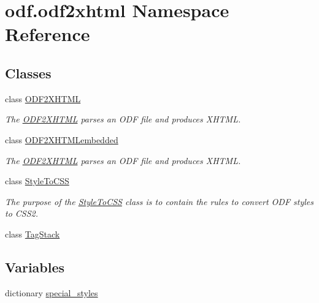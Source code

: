 \hypertarget{namespaceodf_1_1odf2xhtml}{\section{odf.\+odf2xhtml Namespace Reference}
\label{namespaceodf_1_1odf2xhtml}
}
\subsection*{Classes}
\begin{DoxyCompactItemize}
\item 
class \hyperlink{classodf_1_1odf2xhtml_1_1ODF2XHTML}{O\+D\+F2\+X\+H\+T\+M\+L}
\begin{DoxyCompactList}\small\item\em The \hyperlink{classodf_1_1odf2xhtml_1_1ODF2XHTML}{O\+D\+F2\+X\+H\+T\+M\+L} parses an O\+D\+F file and produces X\+H\+T\+M\+L. \end{DoxyCompactList}\item 
class \hyperlink{classodf_1_1odf2xhtml_1_1ODF2XHTMLembedded}{O\+D\+F2\+X\+H\+T\+M\+Lembedded}
\begin{DoxyCompactList}\small\item\em The \hyperlink{classodf_1_1odf2xhtml_1_1ODF2XHTML}{O\+D\+F2\+X\+H\+T\+M\+L} parses an O\+D\+F file and produces X\+H\+T\+M\+L. \end{DoxyCompactList}\item 
class \hyperlink{classodf_1_1odf2xhtml_1_1StyleToCSS}{Style\+To\+C\+S\+S}
\begin{DoxyCompactList}\small\item\em The purpose of the \hyperlink{classodf_1_1odf2xhtml_1_1StyleToCSS}{Style\+To\+C\+S\+S} class is to contain the rules to convert O\+D\+F styles to C\+S\+S2. \end{DoxyCompactList}\item 
class \hyperlink{classodf_1_1odf2xhtml_1_1TagStack}{Tag\+Stack}
\end{DoxyCompactItemize}
\subsection*{Variables}
\begin{DoxyCompactItemize}
\item 
dictionary \hyperlink{namespaceodf_1_1odf2xhtml_a45771f201b4cf26ab88c538306808fd7}{special\+\_\+styles}
\end{DoxyCompactItemize}


